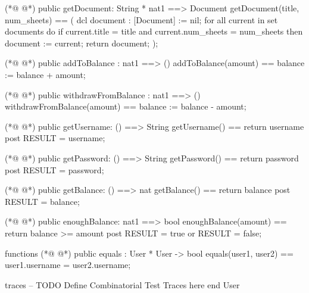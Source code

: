 \begin{vdmpp}[breaklines=true]
(*@
\label{getDocument:66}
@*)
  public getDocument: String * nat1 ==> Document
  getDocument(title, num_sheets) ==
  (
   dcl document : [Document] := nil;
   for all current in set documents do
    if current.title = title and current.num_sheets = num_sheets
    then document := current;
   return document;
  );

 
(*@
\label{addToBalance:77}
@*)
 public addToBalance : nat1 ==> ()
   addToBalance(amount) ==
    balance := balance + amount;
  
(*@
\label{withdrawFromBalance:81}
@*)
 public withdrawFromBalance : nat1 ==> ()
  withdrawFromBalance(amount) ==
   balance := balance - amount;
 
 
(*@
\label{getUsername:86}
@*)
 public getUsername: () ==> String
  getUsername() ==
   return username
   post RESULT = username;
 
(*@
\label{getPassword:91}
@*)
 public getPassword: () ==> String
  getPassword() ==
   return password
   post RESULT = password;
 
(*@
\label{getBalance:96}
@*)
 public getBalance: () ==> nat
  getBalance() ==
   return balance
   post RESULT = balance;
 
(*@
\label{enoughBalance:101}
@*)
 public enoughBalance: nat1 ==> bool
  enoughBalance(amount) ==
   return balance >= amount
   post RESULT = true or RESULT = false;

functions
(*@
\label{equals:107}
@*)
public equals : User * User -> bool
equals(user1, user2) ==
  user1.username = user2.username;

traces
-- TODO Define Combinatorial Test Traces here
end User
\end{vdmpp}
\bigskip
